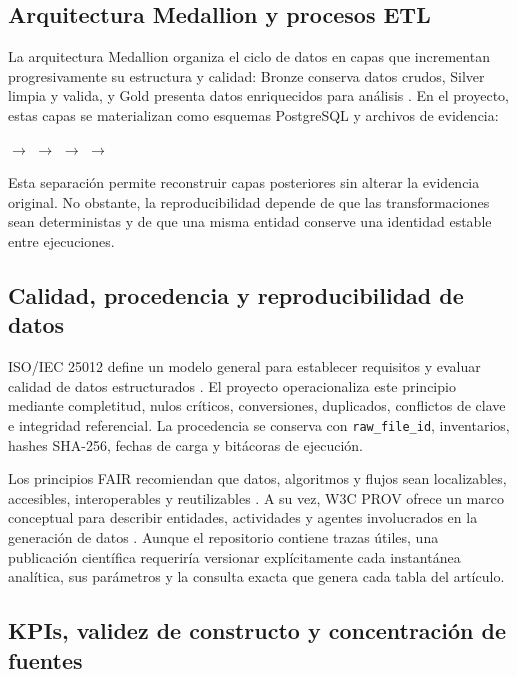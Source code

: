 \documentclass[12pt,a4paper]{article}
\newcommand{\pathcode}[1]{\begingroup\small\ttfamily\nolinkurl{#1}\endgroup}
\begin{document}
\subsection{Arquitectura Medallion y procesos ETL}

La arquitectura Medallion organiza el ciclo de datos en capas que incrementan progresivamente su estructura y calidad: Bronze conserva datos crudos, Silver limpia y valida, y Gold presenta datos enriquecidos para análisis \cite{databricks_medallion}. En el proyecto, estas capas se materializan como esquemas PostgreSQL y archivos de evidencia:

\begin{center}
\small
\setlength{\fboxsep}{8pt}
$\rightarrow$
$\rightarrow$
$\rightarrow$
$\rightarrow$
\end{center}

Esta separación permite reconstruir capas posteriores sin alterar la evidencia original. No obstante, la reproducibilidad depende de que las transformaciones sean deterministas y de que una misma entidad conserve una identidad estable entre ejecuciones.

\subsection{Calidad, procedencia y reproducibilidad de datos}

ISO/IEC 25012 define un modelo general para establecer requisitos y evaluar calidad de datos estructurados \cite{iso25012}. El proyecto operacionaliza este principio mediante completitud, nulos críticos, conversiones, duplicados, conflictos de clave e integridad referencial. La procedencia se conserva con \pathcode{raw_file_id}, inventarios, hashes SHA-256, fechas de carga y bitácoras de ejecución.

Los principios FAIR recomiendan que datos, algoritmos y flujos sean localizables, accesibles, interoperables y reutilizables \cite{fair}. A su vez, W3C PROV ofrece un marco conceptual para describir entidades, actividades y agentes involucrados en la generación de datos \cite{prov}. Aunque el repositorio contiene trazas útiles, una publicación científica requeriría versionar explícitamente cada instantánea analítica, sus parámetros y la consulta exacta que genera cada tabla del artículo.

\subsection{KPIs, validez de constructo y concentración de fuentes}
\end{document}

